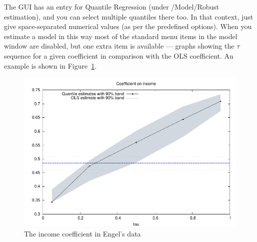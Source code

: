 The  GUI has an entry for Quantile Regression (under
\textsf{/Model/Robust estimation}), and you can select multiple
quantiles there too.  In that context, just give space-separated
numerical values (as per the predefined options).  When you estimate a
model in this way most of the standard menu items in the model window
are disabled, but one extra item is available --- graphs showing the
$\tau$ sequence for a given coefficient in comparison with the OLS
coefficient.  An example is shown in Figure~\ref{fig:tau}.

\begin{figure}
  \centering
  \includegraphics[scale=.8]{figures/tau-sequence}
  \caption{The income coefficient in Engel's data}
  \label{fig:tau}
\end{figure}

